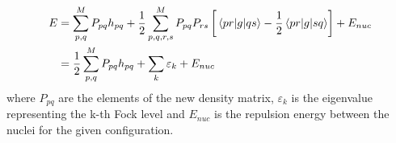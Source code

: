 \begin{enumerate}
    \begin{align}
	    	E &= \sum_{p,q}^MP_{pq} h_{pq} + \frac{1}{2}\sum_{p,q,r,s}^M P_{pq}P_{rs}\left[\mel{pr}{g}{qs}-\frac{1}{2}\mel{pr}{g}{sq}\right]+E_{nuc}\nonumber\\
    	&= \frac{1}{2}\sum_{p,q}^MP_{pq} h_{pq}+\sum_k \varepsilon_k + E_{nuc}
    		\label{eq:energy_computer}
    \end{align}
    where $P_{pq}$ are the elements of the new density matrix, $\varepsilon_k$ is the eigenvalue representing the k-th Fock level and $E_{nuc}$ is the repulsion energy between the nuclei for the given configuration.
\end{enumerate}
    



